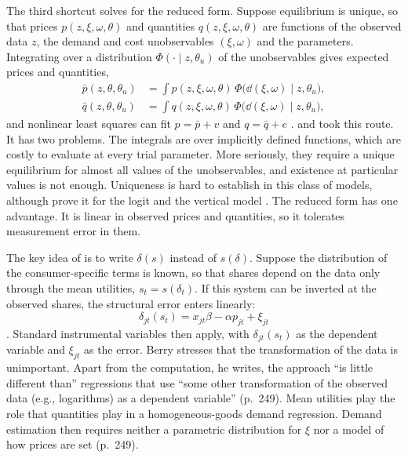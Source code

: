 The third shortcut solves for the reduced form. Suppose equilibrium is unique, so that prices $p(z, \xi,
\omega, \theta)$ and quantities $q(z, \xi, \omega, \theta)$ are functions of the observed data $z$, the demand
and cost unobservables $(\xi, \omega)$ and the parameters. Integrating over a distribution $\Phi(\cdot \mid z,
\theta_u)$ of the unobservables gives expected prices and quantities,
\begin{align*}
  \bar p(z, \theta, \theta_u) &= \int p(z, \xi, \omega, \theta)\,\Phi\big(\dd(\xi, \omega) \mid z, \theta_u\big),\\
  \bar q(z, \theta, \theta_u) &= \int q(z, \xi, \omega, \theta)\,\Phi\big(\dd(\xi, \omega) \mid z, \theta_u\big),
\end{align*}
and nonlinear least squares can fit $p = \bar p + v$ and $q = \bar q + e$ \citep[eqs.~34 and
35]{Berry1994}. \citet{Bresnahan1987} and \citet{Berry1990} took this route. It has two problems. The integrals
are over implicitly defined functions, which are costly to evaluate at every trial parameter. More seriously,
they require a unique equilibrium for almost all values of the unobservables, and existence at particular values
is not enough. Uniqueness is hard to establish in this class of models, although \citet{CaplinNalebuff1991}
prove it for the logit and the vertical model \citep[p.~257]{Berry1994}. The reduced form has one advantage.
It is linear in observed prices and quantities, so it tolerates measurement error in them.

The key idea of \citet{Berry1994} is to write $\delta(s)$ instead of $s(\delta)$. Suppose the distribution of
the consumer-specific terms is known, so that shares depend on the data only through the mean utilities,
$s_t = s(\delta_t)$. If this system can be inverted at the observed shares, the structural error enters
linearly:
\begin{equation}\label{eq:07-berry-linear}
  \delta_{jt}(s_t) = x_{jt}\beta - \alpha p_{jt} + \xi_{jt}
\end{equation}
\citep[eq.~12]{Berry1994}. Standard instrumental variables then apply, with $\delta_{jt}(s_t)$ as the dependent
variable and $\xi_{jt}$ as the error. Berry stresses that the transformation of the data is unimportant.
Apart from the computation, he writes, the approach ``is little different than'' regressions that use ``some
other transformation of the observed data (e.g., logarithms) as a dependent variable'' (p.~249). Mean
utilities play the role that quantities play in a homogeneous-goods demand regression. Demand estimation then
requires neither a parametric distribution for $\xi$ nor a model of how prices are set (p.~249).

